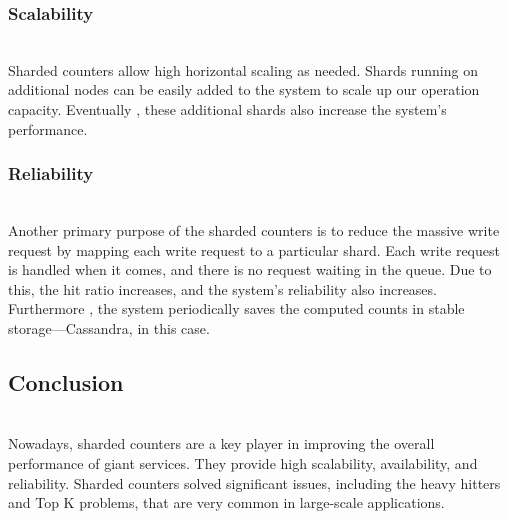 \subsubsection{Scalability}\label{AA9V9vtCzkgfmMZbDd_UX}
\\
Sharded counters allow high horizontal scaling as needed. Shards running on additional nodes can be easily added to the system to scale up our operation capacity. Eventually , these additional shards also increase the system's performance.

\subsubsection{Reliability}\label{m-8k_I0uUD2349tEIGqtY}
\\
Another primary purpose of the sharded counters is to reduce the massive write request by mapping each write request to a particular shard. Each write request is handled when it comes, and there is no request waiting in the queue. Due to this, the hit ratio increases, and the system's reliability also increases. Furthermore , the system periodically saves the computed counts in stable storage---Cassandra, in this case.

\subsection{Conclusion}\label{N9Vqas3xLNaMlGbTgNab1}
\\
Nowadays, sharded counters are a key player in improving the overall performance of giant services. They provide high scalability, availability, and reliability. Sharded counters solved significant issues, including the heavy hitters and Top K problems, that are very common in large-scale applications.

